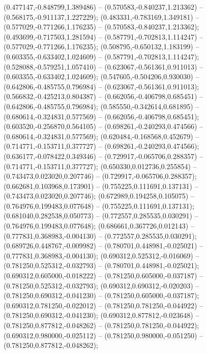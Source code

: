  (0.477147,-0.848799,1.389486) -- (0.570583,-0.840237,1.213362) -- (0.568175,-0.911137,1.227229);
 (0.483331,-0.783169,1.349181) -- (0.577029,-0.771266,1.176235) -- (0.570583,-0.840237,1.213362);
 (0.493699,-0.717503,1.281594) -- (0.587791,-0.702813,1.114247) -- (0.577029,-0.771266,1.176235);
 (0.508795,-0.650132,1.183199) -- (0.603355,-0.633402,1.024609) -- (0.587791,-0.702813,1.114247);
 (0.528088,-0.579251,1.057410) -- (0.623067,-0.561361,0.911013) -- (0.603355,-0.633402,1.024609);
 (0.547605,-0.504206,0.930030) -- (0.642806,-0.485755,0.796984) -- (0.623067,-0.561361,0.911013);
 (0.566832,-0.425213,0.804387) -- (0.662056,-0.406798,0.685451) -- (0.642806,-0.485755,0.796984);
 (0.585550,-0.342614,0.681895) -- (0.680614,-0.324831,0.577569) -- (0.662056,-0.406798,0.685451);
 (0.603520,-0.256870,0.564105) -- (0.698261,-0.240293,0.474566) -- (0.680614,-0.324831,0.577569);
 (0.620484,-0.168568,0.452679) -- (0.714771,-0.153711,0.377727) -- (0.698261,-0.240293,0.474566);
 (0.636177,-0.078422,0.349346) -- (0.729917,-0.065706,0.288357) -- (0.714771,-0.153711,0.377727);
 (0.650330,0.012736,0.255854) -- (0.743473,0.023020,0.207746) -- (0.729917,-0.065706,0.288357);
 (0.662681,0.103968,0.173901) -- (0.755225,0.111691,0.137131) -- (0.743473,0.023020,0.207746);
 (0.672989,0.194258,0.105075) -- (0.764976,0.199483,0.077648) -- (0.755225,0.111691,0.137131);
 (0.681040,0.282538,0.050773) -- (0.772557,0.285535,0.030291) -- (0.764976,0.199483,0.077648);
 (0.686661,0.367726,0.012143) -- (0.777831,0.368983,-0.004130) -- (0.772557,0.285535,0.030291);
 (0.689726,0.448767,-0.009982) -- (0.780701,0.448981,-0.025021) -- (0.777831,0.368983,-0.004130);
 (0.690312,0.525312,-0.016069) -- (0.781250,0.525312,-0.032793) -- (0.780701,0.448981,-0.025021);
 (0.690312,0.605000,-0.018222) -- (0.781250,0.605000,-0.037187) -- (0.781250,0.525312,-0.032793);
 (0.690312,0.690312,-0.020203) -- (0.781250,0.690312,-0.041230) -- (0.781250,0.605000,-0.037187);
 (0.690312,0.781250,-0.022012) -- (0.781250,0.781250,-0.044922) -- (0.781250,0.690312,-0.041230);
 (0.690312,0.877812,-0.023648) -- (0.781250,0.877812,-0.048262) -- (0.781250,0.781250,-0.044922);
 (0.690312,0.980000,-0.025112) -- (0.781250,0.980000,-0.051250) -- (0.781250,0.877812,-0.048262);
